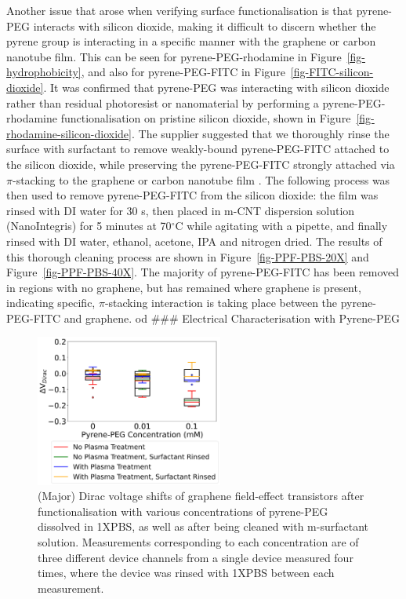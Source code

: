 \documentclass[
  a4paper,
]{scrbook}
\begin{document}
Another issue that arose when verifying surface functionalisation is
that pyrene-PEG interacts with silicon dioxide, making it difficult to
discern whether the pyrene group is interacting in a specific manner
with the graphene or carbon nanotube film. This can be seen for
pyrene-PEG-rhodamine in Figure~\ref{fig-hydrophobicity}, and also for
pyrene-PEG-FITC in Figure~\ref{fig-FITC-silicon-dioxide}. It was
confirmed that pyrene-PEG was interacting with silicon dioxide rather
than residual photoresist or nanomaterial by performing a
pyrene-PEG-rhodamine functionalisation on pristine silicon dioxide,
shown in Figure~\ref{fig-rhodamine-silicon-dioxide}. The supplier
suggested that we thoroughly rinse the surface with surfactant to remove
weakly-bound pyrene-PEG-FITC attached to the silicon dioxide, while
preserving the pyrene-PEG-FITC strongly attached via \(\pi\)-stacking to
the graphene or carbon nanotube film \autocite{CreativePEGworks2022}.
The following process was then used to remove pyrene-PEG-FITC from the
silicon dioxide: the film was rinsed with DI water for 30 s, then placed
in m-CNT dispersion solution (NanoIntegris) for 5 minutes at
70\(^\circ\)C while agitating with a pipette, and finally rinsed with DI
water, ethanol, acetone, IPA and nitrogen dried. The results of this
thorough cleaning process are shown in Figure~\ref{fig-PPF-PBS-20X} and
Figure~\ref{fig-PPF-PBS-40X}. The majority of pyrene-PEG-FITC has been
removed in regions with no graphene, but has remained where graphene is
present, indicating specific, \(\pi\)-stacking interaction is taking
place between the pyrene-PEG-FITC and graphene. od \#\#\# Electrical
Characterisation with Pyrene-PEG

\begin{figure}

{\centering \includegraphics[width=0.55\textwidth,height=\textheight]{figures/ch6/Dirac_shift_comparisons_mPEGpyrene.png}

}

\caption{\label{fig-pypeg-dirac-shift}(Major) Dirac voltage shifts of
graphene field-effect transistors after functionalisation with various
concentrations of pyrene-PEG dissolved in 1XPBS, as well as after being
cleaned with m-surfactant solution. Measurements corresponding to each
concentration are of three different device channels from a single
device measured four times, where the device was rinsed with 1XPBS
between each measurement.}

\end{figure}
\end{document}
